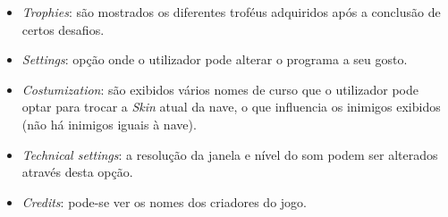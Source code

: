 \documentclass[a4paper,11pt]{article}
\begin{document}
\begin{itemize}
    \item \textit{Trophies}: são mostrados os diferentes troféus adquiridos após a conclusão de certos desafios.

    \item \textit{Settings}: opção onde o utilizador pode alterar o programa a seu gosto.
    \item  \textit{Costumization}: são exibidos vários nomes de curso que o utilizador pode optar para trocar a \textit{Skin} atual da nave, o que influencia os inimigos exibidos (não há inimigos iguais à nave).
    \item  \textit{Technical settings}: a resolução da janela e nível do som podem ser alterados através desta opção.

    \item \textit{Credits}: pode-se ver os nomes dos criadores do jogo.

\end{itemize}
\end{document}
